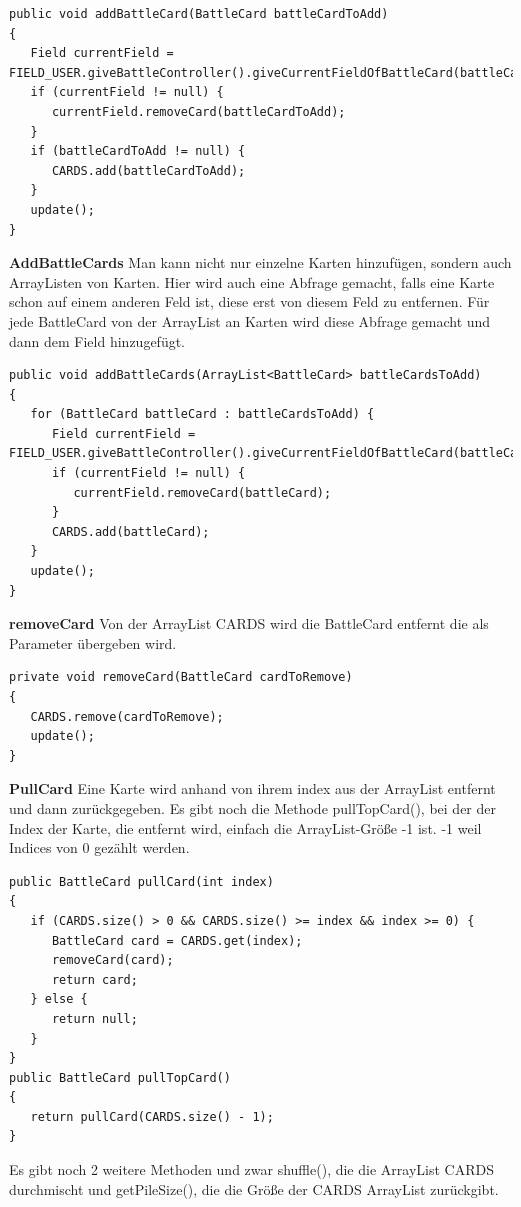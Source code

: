 \begin{lstlisting}
public void addBattleCard(BattleCard battleCardToAdd)
{
   Field currentField = FIELD_USER.giveBattleController().giveCurrentFieldOfBattleCard(battleCardToAdd);
   if (currentField != null) {
      currentField.removeCard(battleCardToAdd);
   }
   if (battleCardToAdd != null) {
      CARDS.add(battleCardToAdd);
   }
   update();
}
\end{lstlisting}

\textbf{AddBattleCards}
Man kann nicht nur einzelne Karten hinzufügen, sondern auch ArrayListen von Karten. Hier wird auch eine Abfrage gemacht, falls eine Karte schon auf einem anderen Feld ist, diese erst von diesem Feld zu entfernen. Für jede BattleCard von der ArrayList an Karten wird diese Abfrage gemacht und dann dem Field hinzugefügt.

\begin{lstlisting}
public void addBattleCards(ArrayList<BattleCard> battleCardsToAdd)
{
   for (BattleCard battleCard : battleCardsToAdd) {
      Field currentField = FIELD_USER.giveBattleController().giveCurrentFieldOfBattleCard(battleCard);
      if (currentField != null) {
         currentField.removeCard(battleCard);
      }
      CARDS.add(battleCard);
   }
   update();
}
\end{lstlisting}

\textbf{removeCard}
Von der ArrayList CARDS wird die BattleCard entfernt die als Parameter übergeben wird.

\begin{lstlisting}
private void removeCard(BattleCard cardToRemove)
{
   CARDS.remove(cardToRemove);
   update();
}
\end{lstlisting}

\textbf{PullCard}
Eine Karte wird anhand von ihrem index aus der ArrayList entfernt und dann zurückgegeben. Es gibt noch die Methode pullTopCard(), bei der der Index der Karte, die entfernt wird, einfach die ArrayList-Größe -1 ist. -1 weil Indices von 0 gezählt werden.

\begin{lstlisting}
public BattleCard pullCard(int index)
{
   if (CARDS.size() > 0 && CARDS.size() >= index && index >= 0) {
      BattleCard card = CARDS.get(index);
      removeCard(card);
      return card;
   } else {
      return null;
   }
}
public BattleCard pullTopCard()
{
   return pullCard(CARDS.size() - 1);
}
\end{lstlisting}

Es gibt noch 2 weitere Methoden und zwar shuffle(), die die ArrayList CARDS durchmischt und getPileSize(), die die Größe der CARDS ArrayList zurückgibt.

